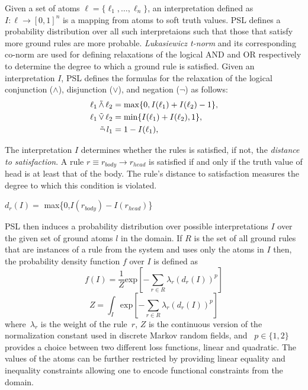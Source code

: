 \documentclass[letterpaper]{article}
\begin{document}
Given a set of atoms 
$\ell = \{\ell_1,\ldots,\ell_n\}$,
an interpretation defined as 
$I : \ell \rightarrow [0,1]^n$
is a mapping from atoms to soft truth values.
PSL defines a probability distribution over all such interpretaions such that those that satisfy more ground rules are more probable.
\emph{Lukasiewicz t-norm} and its corresponding co-norm are used for defining relaxations of the logical AND and OR respectively to determine the degree to which a ground rule is satisfied.
Given an interpretation $\mathit{I}$, PSL defines the formulas for the relaxation of the logical conjunction ($\wedge$), disjunction ($\vee$), and negation ($\neg$) as follows:
\small
\begin{align*}
\ell_1 \softand \ell_2 &= \max\{0, I(\ell_1) + I(\ell_2) - 1\},\\
\ell_1 \softor \ell_2 &= \min\{I(\ell_1) + I(\ell_2), 1\},\\
\softneg l_1 &= 1 - I(\ell_1),
\end{align*}  

\normalsize
The interpretation $\mathit{I}$ determines whether the rules is satisfied, if not, the \emph{distance to satisfaction}.
A rule $\mathit{r} \equiv \mathit{r_{body}} \rightarrow \mathit{r_{head}} $  is satisfied if and only if the truth value of head is at least that of the body. The rule's distance to satisfaction measures the degree to which this condition is violated.
 \newline
 \small
\begin{center} 
 $\mathit{d_r}(\mathit{I}) =$ max\{0,$\mathit{I(r_{body})} - \mathit{I(r_{head})}$\}
 \end{center}

\normalsize
PSL then induces a probability distribution over possible interpretations $\mathit{I}$ over the given set of ground atoms $\mathit{l} $ in the domain. 
If $\mathit{R}$ is the set of all ground rules that are instances of a rule from the system and uses only the atoms in  $\mathit{I}$ then,
the probability density function $\mathit{f}$ over $\mathit{I}$ is defined as
\small
\begin{equation}
\label{eq:contimn1}
    f (I) = \frac{1}{Z} \text{exp}[-\sum_{r\in R} \lambda_r (d_r(I))^p]
\end{equation}
\begin{equation}
\label{eq:contimn2}
	Z = \int_{I} \text{exp} [ -\sum_{r\in R} \lambda_r (d_r(I))^p ]
\end{equation}
\normalsize
where~$\lambda_r$ is the weight of the rule~$r$, $Z$ is the continuous version of the normalization constant used in discrete Markov random fields, and ~$p \in \{1, 2\}$ provides a choice between two different loss functions, linear and quadratic.
The values of the atoms can be further restricted by providing linear equality and inequality constraints allowing one to encode functional constraints from the domain. 
\end{document}
